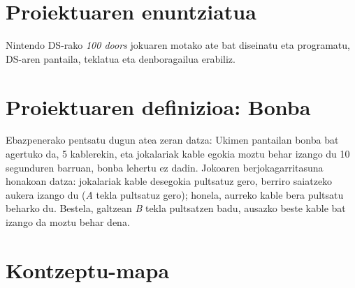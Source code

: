 \documentclass[dvipsnames]{../../../../AritzhClass}
\author{Aritz Lopez}
\begin{document}
\izenburuorrialdea

\tableofcontents

\pagebreak

\section{Proiektuaren enuntziatua}

Nintendo DS-rako \textit{100 doors} jokuaren motako ate bat diseinatu eta programatu, DS-aren pantaila, teklatua eta denboragailua erabiliz.

\section{Proiektuaren definizioa: Bonba}

Ebazpenerako pentsatu dugun atea zeran datza: Ukimen pantailan bonba bat agertuko da, 5 kablerekin, eta jokalariak kable egokia moztu behar izango du 10 segunduren barruan, bonba lehertu ez dadin. Jokoaren berjokagarritasuna honakoan datza: jokalariak kable desegokia pultsatuz gero, berriro saiatzeko aukera izango du (\textit{A} tekla pultsatuz gero); honela, aurreko kable bera pultsatu beharko du. Bestela, galtzean \textit{B} tekla pultsatzen badu, ausazko beste kable bat izango da moztu behar dena.

\section{Kontzeptu-mapa}
\end{document}
